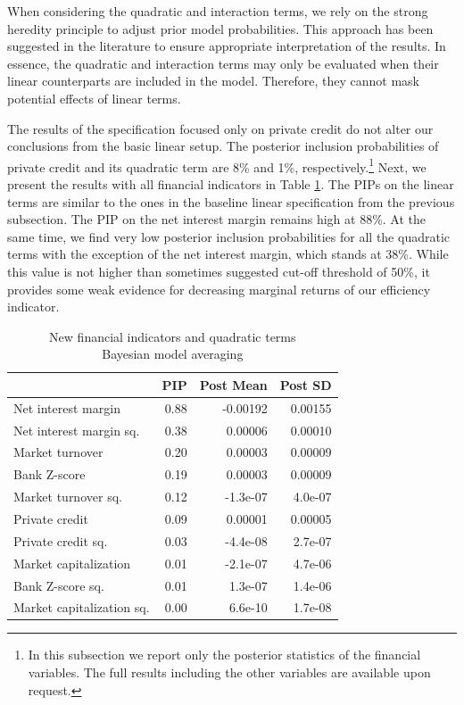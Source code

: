 \begin{refsection}
When considering the quadratic and interaction terms, we rely on the strong heredity principle to adjust prior model probabilities. This approach has been suggested in the literature to ensure appropriate interpretation of the results. In essence, the quadratic and interaction terms may only be evaluated when their linear counterparts are included in the model. Therefore, they cannot mask potential effects of linear terms. 

The results of the specification focused only on private credit do not alter our conclusions from the basic linear setup. The posterior inclusion probabilities of private credit and its quadratic term are 8\% and 1\%, respectively.\footnote{In this subsection we report only the posterior statistics of the financial variables. The full results including the other variables are available upon request.} Next, we present the results with all financial indicators in Table \ref{ch2fig:BMAquad}. The \acp{PIP} on the linear terms are similar to the ones in the baseline linear specification from the previous subsection. The \ac{PIP} on the net interest margin remains high at 88\%. At the same time, we find very low posterior inclusion probabilities for all the quadratic terms with the exception of the net interest margin, which stands at 38\%. While this value is not higher than sometimes suggested cut-off threshold of 50\%, it provides some weak evidence for decreasing marginal returns of our efficiency indicator. 

\begin{table}[!htbp]
	\centering
	\caption{New financial indicators and quadratic terms\\
		Bayesian model averaging}
		\label{ch2fig:BMAquad}
	\small
	\begin{tabular}{lrrr}
		\toprule
		& PIP & Post Mean & Post SD \\ 
		\midrule
		  Net interest margin & 0.88 & -0.00192 & 0.00155\\ 
		  Net interest margin sq. & 0.38 & 0.00006 & 0.00010\\ 
		  Market turnover & 0.20 & 0.00003 & 0.00009\\ 
		  Bank Z-score & 0.19 & 0.00003 & 0.00009\\ 
		  Market turnover sq. & 0.12 & -1.3e-07 & 4.0e-07 \\ 
		  Private credit & 0.09 & 0.00001 & 0.00005\\ 
		  Private credit sq. & 0.03 & -4.4e-08 & 2.7e-07 \\ 
		  Market capitalization & 0.01 & -2.1e-07 & 4.7e-06 \\ 
		  Bank Z-score sq. & 0.01 & 1.3e-07 & 1.4e-06 \\ 
		  Market capitalization sq. & 0.00 & 6.6e-10 & 1.7e-08 \\
		\bottomrule
	\end{tabular}
\end{table}


\end{refsection}
